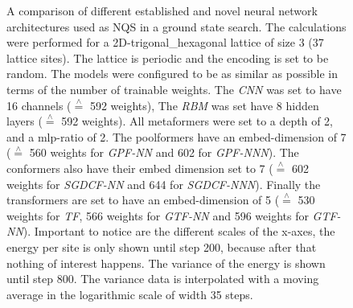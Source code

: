 \begin{figure}[htbp]
    \centering
    \caption{A comparison of different established and novel neural network architectures used as NQS in a ground state search.
        The calculations were performed for a 2D-trigonal\_hexagonal lattice of size 3 (37 lattice sites).
        The lattice is periodic and the encoding is set to be random.
        The models were configured to be as similar as possible in terms of the number of trainable weights.
        The \emph{CNN} was set to have 16 channels ($\stackrel{\wedge}{=}$ 592 weights), The \emph{RBM} was set have 8 hidden layers ($\stackrel{\wedge}{=}$ 592 weights). 
        All metaformers were set to a depth of 2, and a mlp-ratio of 2.
        The poolformers have an embed-dimension of 7 ($\stackrel{\wedge}{=}$ 560 weights for \emph{GPF-NN} and 602 for \emph{GPF-NNN}).
        The conformers also have their embed dimension set to 7 ($\stackrel{\wedge}{=}$ 602 weights for \emph{SGDCF-NN} and 644 for \emph{SGDCF-NNN}).
        Finally the transformers are set to have an embed-dimension of 5 ($\stackrel{\wedge}{=}$ 530 weights for \emph{TF}, 566 weights for \emph{GTF-NN} and 596 weights for \emph{GTF-NN}). 
        Important to notice are the different scales of the x-axes, the energy per site is only shown until step 200, because after that nothing of interest happens. The variance of the energy is shown until step 800.  
        The variance data is interpolated with a moving average in the logarithmic scale of width 35 steps.
    }
    \label{fig:gss-architectures-comp}
\end{figure}

